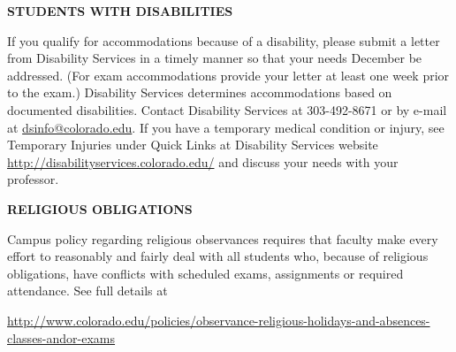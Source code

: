 \documentclass[11pt]{article}
\begin{document}


\newpage
\normalsize

\textbf{\normalsize STUDENTS WITH DISABILITIES}

\small
If you qualify for accommodations because of a disability, please
submit a letter from Disability Services in a timely manner so
that your needs December be addressed. (For exam accommodations provide your letter at least one week prior to the exam.) Disability Services determines
accommodations based on documented disabilities. Contact Disability 
Services at 303-492-8671 or by e-mail at \url{dsinfo@colorado.edu}.
If you have a temporary medical condition or injury, see Temporary Injuries under Quick Links at
Disability Services website {\footnotesize \url{http://disabilityservices.colorado.edu/}} and discuss your needs with your professor.


\bigskip

\textbf{\normalsize RELIGIOUS OBLIGATIONS}



Campus policy regarding religious observances requires that faculty
make every effort to reasonably and fairly deal with all students
who, because of religious obligations, have conflicts with scheduled
exams, assignments or required attendance. See full
details at

{\footnotesize \noindent \url{http://www.colorado.edu/policies/observance-religious-holidays-and-absences-classes-andor-exams} }
\end{document}
